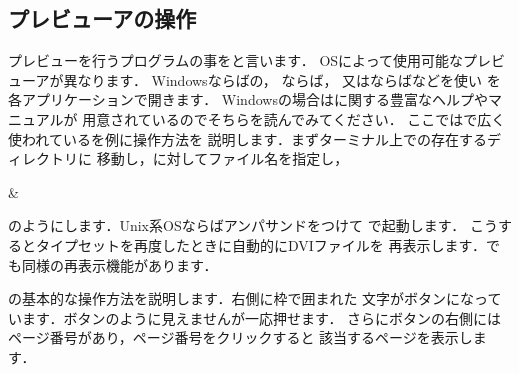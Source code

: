 {{{{{\subsection{プレビューアの操作}
%
プレビューを行うプログラムの事をと言います．
OSによって使用可能なプレビューアが異なります．
%
Windowsならばの\Prog[dviout]{\Dviout}，
%
\unixos ならば，
%
又はならばなどを使い
を各アプリケーションで開きます．
Windowsの場合は\prog{\Dviout}に関する豊富なヘルプやマニュアルが
用意されているのでそちらを読んでみてください．
ここでは\unixos で広く使われているを例に操作方法を
説明します．まずターミナル上での存在するディレクトリに
移動し，に対してファイル名を指定し，
\begin{InTerm}
    \str &
\end{InTerm}
のようにします．Unix系OSならばアンパサンド\qu{\texttt\&}をつけて
で起動します．%
こうするとタイプセットを再度したときに自動的にDVIファイルを
再表示します．\Dviout でも同様の再表示機能があります．

の基本的な操作方法を説明します．右側に枠で囲まれた
文字がボタンになっています．ボタンのように見えませんが一応押せます．
さらにボタンの右側にはページ番号があり，ページ番号をクリックすると
該当するページを表示します．

}}}}}
